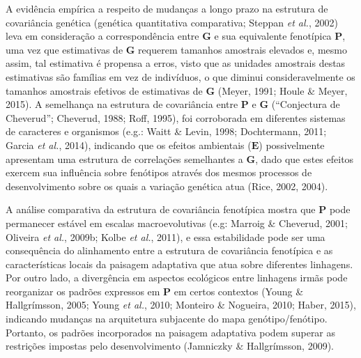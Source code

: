 \documentclass[12pt,twoside]{report}
\begin{document}
A evidência empírica a respeito de mudanças a longo prazo na estrutura
de covariância genética (genética quantitativa comparativa; Steppan
\emph{et al.}, 2002) leva em consideração a correspondência entre
$\mathbf{G}$ e sua equivalente fenotípica $\mathbf{P}$, uma vez que
estimativas de $\mathbf{G}$ requerem tamanhos amostrais elevados e,
mesmo assim, tal estimativa é propensa a erros, visto que as unidades
amostrais destas estimativas são famílias em vez de indivíduos, o que
diminui consideravelmente os tamanhos amostrais efetivos de estimativas
de $\mathbf{G}$ (Meyer, 1991; Houle \& Meyer, 2015). A semelhança na
estrutura de covariância entre $\mathbf{P}$ e $\mathbf{G}$ (``Conjectura
de Cheverud''; Cheverud, 1988; Roff, 1995), foi corroborada em
diferentes sistemas de caracteres e organismos (e.g.: Waitt \& Levin,
1998; Dochtermann, 2011; Garcia \emph{et al.}, 2014), indicando que os
efeitos ambientais ($\mathbf{E}$) possivelmente apresentam uma estrutura
de correlações semelhantes a $\mathbf{G}$, dado que estes efeitos
exercem sua influência sobre fenótipos através dos mesmos processos de
desenvolvimento sobre os quais a variação genética atua (Rice, 2002,
2004).

A análise comparativa da estrutura de covariância fenotípica mostra que
$\mathbf{P}$ pode permanecer estável em escalas macroevolutivas (e.g:
Marroig \& Cheverud, 2001; Oliveira \emph{et al.}, 2009b; Kolbe \emph{et
al.}, 2011), e essa estabilidade pode ser uma consequência do
alinhamento entre a estrutura de covariância fenotípica e as
características locais da paisagem adaptativa que atua sobre diferentes
linhagens. Por outro lado, a divergência em aspectos ecológicos entre
linhagens irmãs pode reorganizar os padrões expressos em $\mathbf{P}$ em
certos contextos (Young \& Hallgrímsson, 2005; Young \emph{et al.},
2010; Monteiro \& Nogueira, 2010; Haber, 2015), indicando mudanças na
arquitetura subjacente do mapa genótipo/fenótipo. Portanto, os padrões
incorporados na paisagem adaptativa podem superar as restrições impostas
pelo desenvolvimento (Jamniczky \& Hallgrímsson, 2009).
\end{document}
